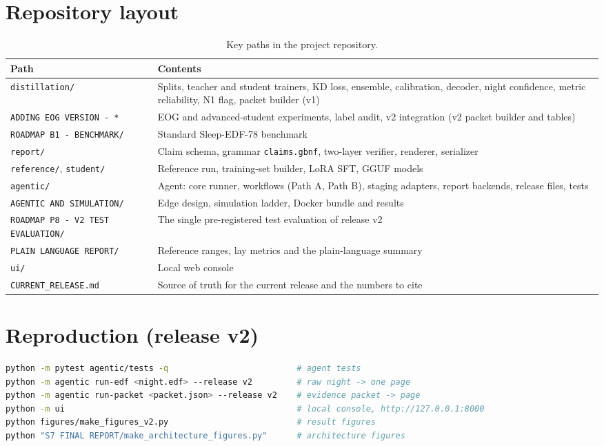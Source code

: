 \section{Repository layout}

\begin{table}[htbp]
\centering\small
\caption{Key paths in the project repository.}
\begin{tabularx}{\textwidth}{p{}Y}
\toprule
Path & Contents \\
\midrule
\texttt{distillation/} & Splits, teacher and student trainers, KD loss, ensemble, calibration, decoder, night confidence, metric reliability, N1 flag, packet builder (v1) \\
\texttt{ADDING EOG VERSION - *} & EOG and advanced-student experiments, label audit, v2 integration (v2 packet builder and tables) \\
\texttt{ROADMAP B1 - BENCHMARK/} & Standard Sleep-EDF-78 benchmark \\
\texttt{report/} & Claim schema, grammar \texttt{claims.gbnf}, two-layer verifier, renderer, serializer \\
\texttt{reference/}, \texttt{student/} & Reference run, training-set builder, LoRA SFT, GGUF models \\
\texttt{agentic/} & Agent: core runner, workflows (Path A, Path B), staging adapters, report backends, release files, tests \\
\texttt{AGENTIC AND SIMULATION/} & Edge design, simulation ladder, Docker bundle and results \\
\texttt{ROADMAP P8 - V2 TEST EVALUATION/} & The single pre-registered test evaluation of release v2 \\
\texttt{PLAIN LANGUAGE REPORT/} & Reference ranges, lay metrics and the plain-language summary \\
\texttt{ui/} & Local web console \\
\texttt{CURRENT\_RELEASE.md} & Source of truth for the current release and the numbers to cite \\
\bottomrule
\end{tabularx}
\end{table}

\section{Reproduction (release v2)}

\begin{lstlisting}[language=bash]
python -m pytest agentic/tests -q                          # agent tests
python -m agentic run-edf <night.edf> --release v2         # raw night -> one page
python -m agentic run-packet <packet.json> --release v2    # evidence packet -> page
python -m ui                                               # local console, http://127.0.0.1:8000
python figures/make_figures_v2.py                          # result figures
python "S7 FINAL REPORT/make_architecture_figures.py"      # architecture figures
\end{lstlisting}

